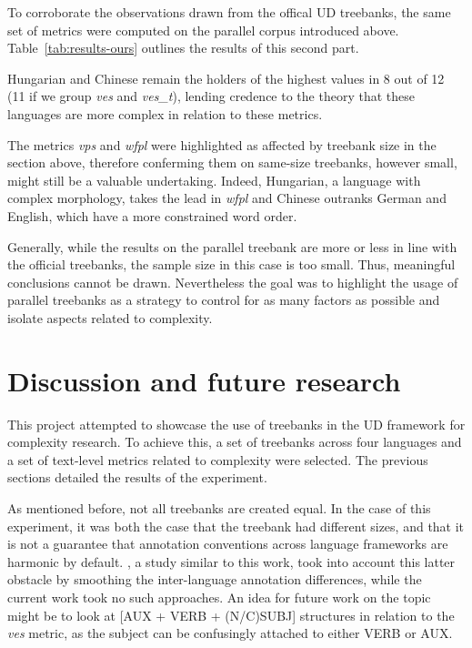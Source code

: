 \documentclass[11pt]{article}
\begin{document}


To corroborate the observations drawn from the offical UD treebanks, the same set of metrics were computed on the parallel corpus introduced above. Table~\ref{tab:results-ours} outlines the results of this second part.

Hungarian and Chinese remain the holders of the highest values in 8 out of 12 (11 if we group \emph{ves} and \emph{ves\_t}), lending credence to the theory that these languages are more complex in relation to these metrics. 

The metrics \emph{vps} and \emph{wfpl} were highlighted as affected by treebank size in the section above, therefore conferming them on same-size treebanks, however small, might still be a valuable undertaking. Indeed, Hungarian, a language with complex morphology, takes the lead in \emph{wfpl} and Chinese outranks German and English, which have a more constrained word order. 

Generally, while the results on the parallel treebank are more or less in line with the official treebanks, the sample size in this case is too small. Thus, meaningful conclusions cannot be drawn. Nevertheless the goal was to highlight the usage of parallel treebanks as a strategy to control for as many factors as possible and isolate aspects related to complexity.

\section{Discussion and future research}

This project attempted to showcase the use of treebanks in the UD framework for complexity research. To achieve this, a set of treebanks across four languages and a set of text-level metrics related to complexity were selected. The previous sections detailed the results of the experiment.

As mentioned before, not all treebanks are created equal. In the case of this experiment, it was both the case that the treebank had different sizes, and that it is not a guarantee that annotation conventions across language frameworks are harmonic by default. \citep{berdicevskis-etal-2018-using}, a study similar to this work, took into account this latter obstacle by smoothing the inter-language annotation differences, while the current work took no such approaches. An idea for future work on the topic might be to look at [AUX + VERB + (N/C)SUBJ] structures in relation to the \emph{ves} metric, as the subject can be confusingly attached to either VERB or AUX.
\end{document}
